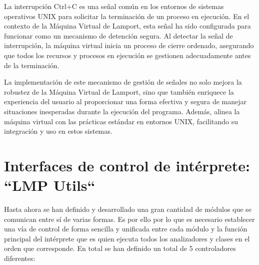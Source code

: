 La interrupción Ctrl+C es una señal común en los entornos de sistemas operativos UNIX para solicitar la terminación de un proceso en ejecución. En el contexto de la Máquina Virtual de Lamport, esta señal ha sido configurada para funcionar como un mecanismo de detención segura. Al detectar la señal de interrupción, la máquina virtual inicia un proceso de cierre ordenado, asegurando que todos los recursos y procesos en ejecución se gestionen adecuadamente antes de la terminación.

La implementación de este mecanismo de gestión de señales no solo mejora la robustez de la Máquina Virtual de Lamport, sino que también enriquece la experiencia del usuario al proporcionar una forma efectiva y segura de manejar situaciones inesperadas durante la ejecución del programa. Además, alinea la máquina virtual con las prácticas estándar en entornos UNIX, facilitando su integración y uso en estos sistemas.

\section{Interfaces de control de intérprete: ``LMP Utils``}\label{sec:implementacionLMPUtils}
Hasta ahora se han definido y desarrollado una gran cantidad de módulos que se comunican entre sí de varias formas. Es por ello por lo que es necesario establecer una vía de control de forma sencilla y unificada entre cada módulo y la función principal del intérprete que es quien ejecuta todos los analizadores y clases en el orden que corresponde. En total se han definido un total de 5 controladores diferentes:

